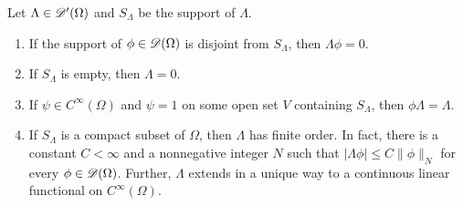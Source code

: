 \begin{theorem}
    Let $\Lambda\in\mathscr{D}'(\Omega)$ and $S_\Lambda$ be the support of $\Lambda$. 
    \begin{enumerate}[label=(\alph*)]
        \item If the support of $\phi\in\mathscr{D}(\Omega)$ is disjoint from $S_\Lambda$, then $\Lambda\phi = 0$.
        \item If $S_\Lambda$ is empty, then $\Lambda = 0$. 
        \item If $\psi\in C^\infty(\Omega)$ and $\psi = 1$ on some open set $V$ containing $S_\Lambda$, then $\phi\Lambda = \Lambda$. 
        \item If $S_\Lambda$ is a compact subset of $\Omega$, then $\Lambda$ has finite order. In fact, there is a constant $C < \infty$ and a nonnegative integer $N$ such that $|\Lambda\phi|\le C\|\phi\|_N$ for every $\phi\in\mathscr{D}(\Omega)$. Further, $\Lambda$ extends in a unique way to a continuous linear functional on $C^\infty(\Omega)$.
    \end{enumerate}
\end{theorem}
